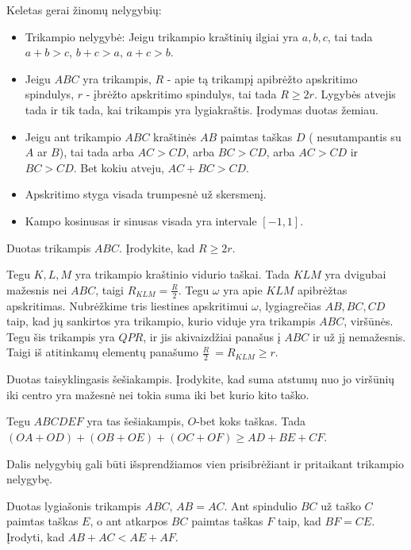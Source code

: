 \begin{teig}
Keletas gerai žinomų nelygybių:
\begin{itemize}

  \item Trikampio nelygybė: Jeigu trikampio kraštinių ilgiai
    yra $a,b,c$, tai tada $a+b>c$, $b+c>a$, $a+c>b$.
   \item Jeigu $ABC$ yra trikampis, $R$ - apie tą trikampį
    apibrėžto apskritimo spindulys, $r$ - įbrėžto apskritimo
    spindulys, tai tada $R\geq2r$. Lygybės atvejis tada ir tik
    tada, kai trikampis yra lygiakraštis. Įrodymas duotas žemiau. 
  \item Jeigu ant trikampio $ABC$ kraštinės $AB$ paimtas
    taškas $D$ ( nesutampantis su $A$ ar $B$), tai tada arba
    $AC>CD$, arba $BC>CD$, arba $AC>CD$ ir $BC>CD$. Bet kokiu
    atveju, $AC+BC>CD$.
  \item Apskritimo styga visada trumpesnė už skersmenį.
  \item Kampo kosinusas ir sinusas visada yra intervale
    $[-1,1]$.
\end{itemize}
\end{teig}

\begin{pav}
Duotas trikampis $ABC$. Įrodykite, kad $R\geq 2r$.
\end{pav}
\begin{sprendimas}
Tegu $K,L,M$ yra trikampio kraštinio vidurio taškai. Tada $KLM$ 
yra dvigubai mažesnis nei $ABC$, taigi $R_{KLM}=\frac{R}{2}$. Tegu
$\omega$  yra apie $KLM$ apibrėžtas apskritimas. Nubrėžkime tris 
liestines apskritimui $\omega$, lygiagrečias $AB,BC,CD$ taip, kad jų
sankirtos yra trikampio, kurio viduje yra trikampis $ABC$, viršūnės.
Tegu šis trikampis yra $QPR$, ir jis akivaizdžiai panašus į $ABC$ ir 
už jį nemažesnis. Taigi iš atitinkamų elementų panašumo $\frac{R}{2}\
=R_{KLM}\geq r$.
\end{sprendimas}

\begin{pav}
Duotas taisyklingasis šešiakampis. Įrodykite, kad suma atstumų nuo jo 
 viršūnių iki centro yra mažesnė nei tokia suma iki bet kurio kito 
 taško.
\end{pav}
\begin{sprendimas}
Tegu $ABCDEF$ yra tas šešiakampis, $O$-bet koks taškas. Tada $(OA+OD)+
(OB+OE)+(OC+OF)\geq AD+BE+CF$.
\end{sprendimas}

Dalis nelygybių gali būti išsprendžiamos vien prisibrėžiant ir pritaikant
trikampio nelygybę.
\begin{pav}
  Duotas lygiašonis trikampis $ABC$, $AB=AC$. Ant spindulio $BC$ už 
  taško $C$ paimtas taškas $E$, o ant atkarpos $BC$ paimtas taškas 
  $F$ taip, kad $BF=CE$. Įrodyti, kad $AB+AC<AE+AF$. 
\end{pav}

